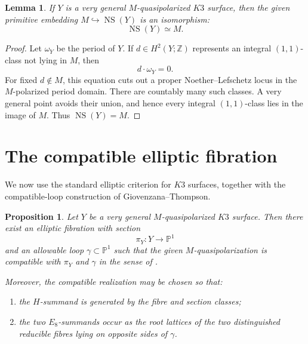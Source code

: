 \documentclass[11pt]{amsart}
\newtheorem{proposition}[theorem]{Proposition}
\newtheorem{lemma}[theorem]{Lemma}
\theoremstyle{definition}
\theoremstyle{remark}
\DeclareMathOperator{\NS}{NS}
\newcommand{\Z}{\mathbb{Z}}
\newcommand{\PP}{\mathbb{P}}
\begin{document}
\begin{lemma}\label{lem:very-general-NS}
If $Y$ is a very general $M$-quasipolarized $K3$ surface, then the given
primitive embedding $M\hookrightarrow \NS(Y)$ is an isomorphism:
\[
\NS(Y)\simeq M.
\]
\end{lemma}

\begin{proof}
Let $\omega_Y$ be the period of $Y$.  If
$d\in H^2(Y;\Z)$ represents an integral $(1,1)$-class not lying in $M$, then
\[
d\cdot\omega_Y=0.
\]
For fixed $d\notin M$, this equation cuts out a proper Noether--Lefschetz
locus in the $M$-polarized period domain.  There are countably many such
classes.  A very general point avoids their union, and hence every integral
$(1,1)$-class lies in the image of $M$.  Thus $\NS(Y)=M$.
\end{proof}

\section{The compatible elliptic fibration}

We now use the standard elliptic criterion for $K3$ surfaces, together with
the compatible-loop construction of Giovenzana--Thompson.

\begin{proposition}\label{prop:compatible-fibration}
Let $Y$ be a very general $M$-quasipolarized $K3$ surface.  Then there exist
an elliptic fibration with section
\[
\pi_Y\colon Y\longrightarrow \PP^1
\]
and an allowable loop $\gamma\subset\PP^1$ such that the given
$M$-quasipolarization is compatible with $\pi_Y$ and $\gamma$ in the sense of
\cite[Definition~4.21]{dfk3slpms}.

Moreover, the compatible realization may be chosen so that:
\begin{enumerate}
\item the $H$-summand is generated by the fibre and section classes;
\item the two $E_8$-summands occur as the root lattices of the two
distinguished reducible fibres lying on opposite sides of $\gamma$.
\end{enumerate}
\end{proposition}
\end{document}
